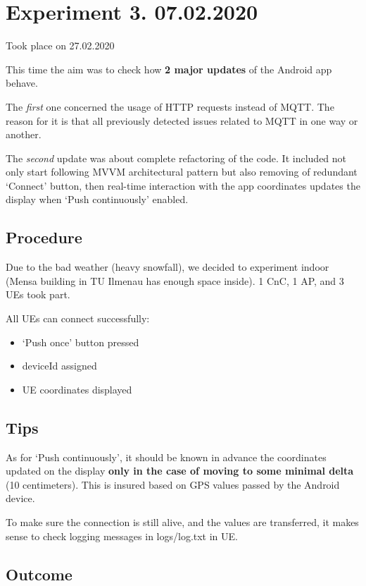 \section{Experiment 3. 07.02.2020}\label{experiment-3.-07.02.2020}

Took place on 27.02.2020

This time the aim was to check how \textbf{2 major updates} of the Android app behave.

The \emph{first} one concerned the usage of HTTP requests instead of MQTT. The reason for it is that all previously detected issues related to MQTT in one way or another.

The \emph{second} update was about complete refactoring of the code. It included not only start following MVVM architectural pattern but also removing of redundant `Connect' button, then real-time interaction with the app coordinates updates the display when `Push continuously' enabled.

\subsection{Procedure}

Due to the bad weather (heavy snowfall), we decided to experiment indoor (Mensa building in TU Ilmenau has enough space inside). 1 CnC, 1 AP, and 3 UEs took part.

All UEs can connect successfully:

\begin{itemize}
\tightlist
\item
  `Push once' button pressed
\item
  deviceId assigned
\item
  UE coordinates displayed
\end{itemize}

\subsection{Tips}

As for `Push continuously', it should be known in advance the
coordinates updated on the display \textbf{only in the case of moving to
some minimal delta} (10 centimeters). This is insured based on GPS
values passed by the Android device.

To make sure the connection is still alive, and the values are transferred, it makes sense to check logging messages in logs/log.txt in UE.

\subsection{Outcome}

